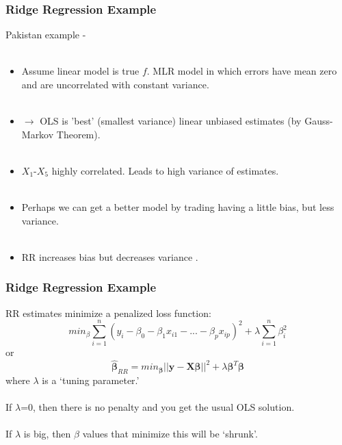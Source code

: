 \documentclass[hide notes,red,handout]{beamer}
\begin{document}
\begin{frame}[t]
\frametitle{Ridge Regression Example}
Pakistan example -\\~\\
\begin{itemize}
\item Assume linear model is true $f$.  MLR model in which errors have mean zero and are uncorrelated with constant variance. \\~\\
\item $\rightarrow$ OLS is 'best' (smallest variance) linear unbiased estimates (by Gauss-Markov Theorem).\\~\\\pause
\item $X_1$-$X_5$ highly correlated.  Leads to high variance of estimates.\\~\\\pause
\item Perhaps we can get a better model by trading having a little bias, but less variance.\\~\\
\item RR increases bias but decreases variance .
\end{itemize}
\end{frame}


\begin{frame}[t]
\frametitle{Ridge Regression Example}
RR estimates minimize a penalized loss function:
$$min_{\beta}\sum_{i=1}^{n}(y_i-\beta_0-\beta_1x_{i1}-...-\beta_px_{ip})^2+\lambda\sum_{i=1}^{n}\beta_i^2$$
or
$$\hat{\boldsymbol{\beta}}_{RR}=min_{\boldsymbol{\beta}}||\boldsymbol{y}-\boldsymbol{X}\boldsymbol{\beta}||^2+\lambda\boldsymbol{\beta}^{T}\boldsymbol{\beta}$$
where $\lambda$ is a `tuning parameter.'\\~\\\pause
If $\lambda$=0, then there is no penalty and you get the usual OLS solution.\\~\\
If $\lambda$ is big, then $\beta$ values that minimize this will be `shrunk'.
\end{frame}
\end{document}
